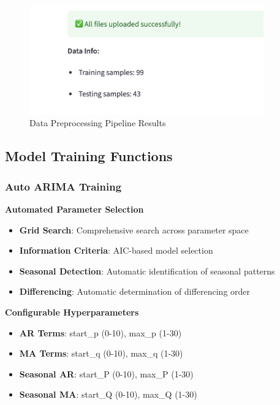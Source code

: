\begin{figure}[H]
	\centering
	\includegraphics[width=0.9\textwidth]{Images/05ApplicationFunctionsAndFeatures/DataPreprocessing.png}
	\caption{Data Preprocessing Pipeline Results}
	\label{fig:data_preprocessing}
\end{figure}

\subsection{Model Training Functions}

\subsubsection{Auto ARIMA Training}

\textbf{Automated Parameter Selection}
\begin{itemize}
	\item \textbf{Grid Search}: Comprehensive search across parameter space
	\item \textbf{Information Criteria}: AIC-based model selection
	\item \textbf{Seasonal Detection}: Automatic identification of seasonal patterns
	\item \textbf{Differencing}: Automatic determination of differencing order
\end{itemize}

\textbf{Configurable Hyperparameters}
\begin{itemize}
	\item \textbf{AR Terms}: start\_p (0-10), max\_p (1-30)
	\item \textbf{MA Terms}: start\_q (0-10), max\_q (1-30)
	\item \textbf{Seasonal AR}: start\_P (0-10), max\_P (1-30)
	\item \textbf{Seasonal MA}: start\_Q (0-10), max\_Q (1-30)
\end{itemize}

